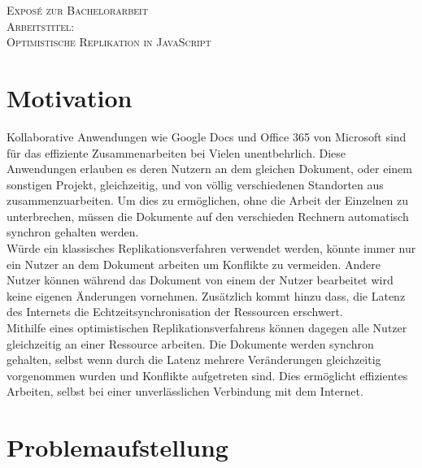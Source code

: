 \documentclass[pdftex,12pt,a4paper]{article}
\begin{document}
\begin{center}
\textsc{\Large Exposé zur Bachelorarbeit}\\[0.5 cm]
\textsc{\Large Arbeitstitel:}\\
\textsc{\huge Optimistische Replikation in JavaScript  }\\
\end{center}

\section{Motivation}

Kollaborative Anwendungen wie Google Docs und Office 365 von Microsoft sind für das effiziente Zusammenarbeiten bei Vielen unentbehrlich. Diese Anwendungen erlauben es deren Nutzern an dem gleichen Dokument, oder einem sonstigen Projekt, gleichzeitig, und von völlig verschiedenen Standorten aus zusammenzuarbeiten. Um dies zu ermöglichen, ohne die Arbeit der Einzelnen zu unterbrechen, müssen die Dokumente auf den verschieden Rechnern automatisch synchron gehalten werden.\\

Würde ein klassisches Replikationsverfahren verwendet werden, könnte immer nur ein Nutzer an dem Dokument arbeiten um Konflikte zu vermeiden. Andere Nutzer können während das Dokument von einem der Nutzer bearbeitet wird keine eigenen Änderungen vornehmen. Zusätzlich kommt hinzu dass, die Latenz des Internets die Echtzeitsynchronisation der Ressourcen erschwert.\\

Mithilfe eines optimistischen Replikationsverfahrens können dagegen alle Nutzer gleichzeitig an einer Ressource arbeiten. Die Dokumente werden synchron gehalten, selbst wenn durch die Latenz mehrere Veränderungen gleichzeitig vorgenommen wurden und Konflikte aufgetreten sind. Dies ermöglicht effizientes Arbeiten, selbst bei einer unverlässlichen Verbindung mit dem Internet.\\

\section{Problemaufstellung}
\end{document}
